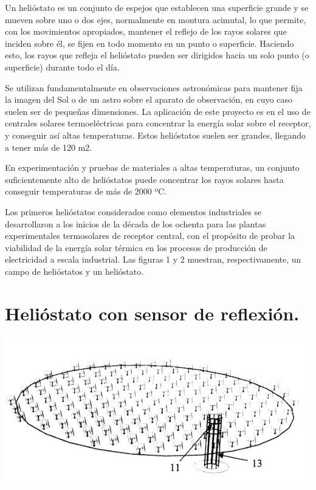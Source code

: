 \documentclass[12pt]{article}
\begin{document}
Un helióstato es un conjunto de espejos que establecen una superficie grande y se mueven sobre uno o dos ejes, normalmente en montura acimutal, lo que permite, con los movimientos apropiados, mantener el reflejo de los rayos solares que inciden sobre él, se fijen en todo momento en un punto o superficie. Haciendo esto, los rayos que refleja el helióstato pueden ser dirigidos hacia un solo punto (o superficie) durante todo el día.

Se utilizan fundamentalmente en observaciones astronómicas para mantener fija la imagen del Sol o de un astro sobre el aparato de observación, en cuyo caso suelen ser de pequeñas dimensiones. La aplicación de este proyecto es en el uso de centrales solares termoeléctricas para concentrar la energía solar sobre el receptor, y conseguir así altas temperaturas. Estos helióstatos suelen ser grandes, llegando a tener más de 120 m2.

En experimentación y pruebas de materiales a altas temperaturas, un conjunto suficientemente alto de helióstatos puede concentrar los rayos solares hasta conseguir temperaturas de más de 2000 ºC.

Los primeros helióstatos considerados como elementos industriales se desarrollaron a los inicios de la década de los ochenta para las plantas experimentales termosolares de receptor central, con el propósito de probar la viabilidad de la energía solar térmica en los procesos de producción de electricidad a escala industrial. Las figuras 1 y 2 muestran, respectivamente, un campo de helióstatos y un helióstato.

\section{Helióstato con sensor de reflexión.}

\includegraphics[width=\textwidth]{unnamed (1).jpg}
\cite{OepmWebSite}
\end{document}
